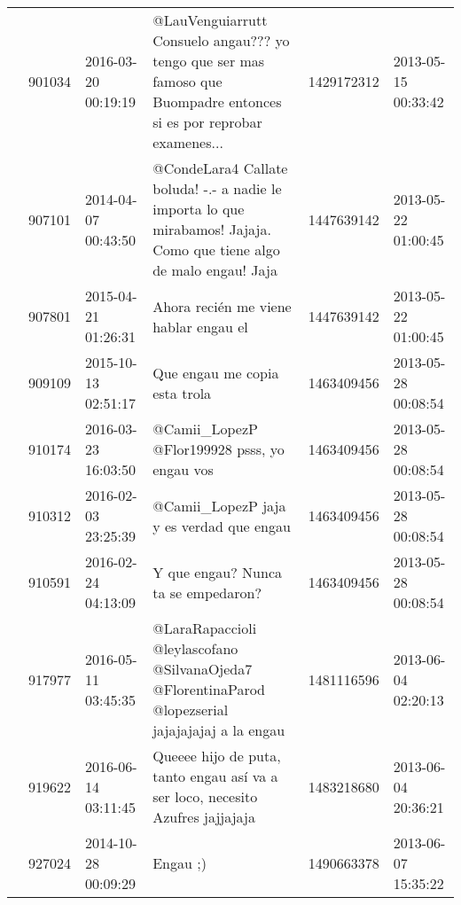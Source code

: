 \begin{tabular}{llllrl}
           & 901034  & 2016-03-20 00:19:19 &                         @LauVenguiarrutt Consuelo angau??? yo tengo que ser mas famoso que Buompadre entonces si es por reprobar examenes... &  1429172312 & 2013-05-15 00:33:42 \\
           & 907101  & 2014-04-07 00:43:50 &                         @CondeLara4 Callate boluda! -.- a nadie le importa lo que mirabamos! Jajaja. Como que tiene algo de malo engau! Jaja &  1447639142 & 2013-05-22 01:00:45 \\
           & 907801  & 2015-04-21 01:26:31 &                                                                                                        Ahora recién me viene hablar engau el &  1447639142 & 2013-05-22 01:00:45 \\
           & 909109  & 2015-10-13 02:51:17 &                                                                                                                Que engau me copia esta trola &  1463409456 & 2013-05-28 00:08:54 \\
           & 910174  & 2016-03-23 16:03:50 &                                                                                                 @Camii\_LopezP @Flor199928 psss, yo engau vos &  1463409456 & 2013-05-28 00:08:54 \\
           & 910312  & 2016-02-03 23:25:39 &                                                                                                     @Camii\_LopezP jaja y es verdad que engau &  1463409456 & 2013-05-28 00:08:54 \\
           & 910591  & 2016-02-24 04:13:09 &                                                                                                          Y que engau? Nunca ta se empedaron? &  1463409456 & 2013-05-28 00:08:54 \\
           & 917977  & 2016-05-11 03:45:35 &                                            @LaraRapaccioli @leylascofano @SilvanaOjeda7 @FlorentinaParod @lopezserial jajajajajaj a la engau &  1481116596 & 2013-06-04 02:20:13 \\
           & 919622  & 2016-06-14 03:11:45 &                                                               Queeee hijo de puta, tanto engau así va a ser loco, necesito Azufres jajjajaja &  1483218680 & 2013-06-04 20:36:21 \\
           & 927024  & 2014-10-28 00:09:29 &                                                                                                                                     Engau ;) &  1490663378 & 2013-06-07 15:35:22 \\

\end{tabular}
